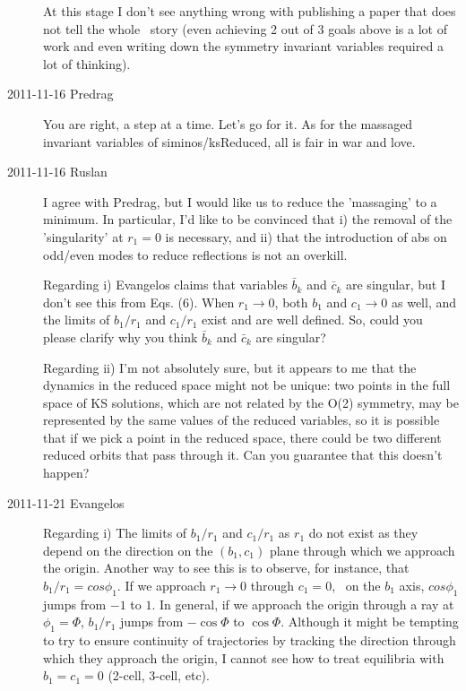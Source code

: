 \begin{description}
At this stage I don't see anything wrong with publishing a paper that does
not tell the whole \KS\ story (even achieving 2 out of 3 goals above is a lot
of work and even writing down the symmetry invariant variables required a lot
of thinking).

\item[2011-11-16 Predrag] You are right, a step at a time. Let's go for
it. As for the massaged invariant variables of siminos/ksReduced, all is
fair in war and love.

\item[2011-11-16 Ruslan] I agree with Predrag, but I would like us to
reduce the 'massaging' to a minimum.  In particular, I'd like to be
convinced that i) the removal of the 'singularity' at $r_1 = 0$ is
necessary, and ii) that the introduction of abs on odd/even modes to
reduce reflections is not an overkill.

    Regarding i) Evangelos claims that variables $\bar{b}_k$ and
    $\bar{c}_k$ are singular, but I don't see this from Eqs. (6).  When
    $r_1 \to 0$, both $b_1$ and $c_1 \to 0$ as well, and the limits of
    $b_1/r_1$ and $c_1/r_1$ exist and are well defined.  So, could you
    please clarify why you think $\bar{b}_k$ and $\bar{c}_k$ are
    singular?

    Regarding ii) I'm not absolutely sure, but it appears to me that the
    dynamics in the reduced space might not be unique: two points in the
    full space of KS solutions, which are not related by the O(2)
    symmetry, may be represented by the same values of the reduced
    variables, so it is possible that if we pick a point in the reduced
    space, there could be two different reduced orbits that pass through
    it.  Can you guarantee that this doesn't happen?

\item[2011-11-21 Evangelos] Regarding i) The limits of
  $b_1/r_1$ and $c_1/r_1$ as $r_1$ do not exist as they depend on the
  direction on the $(b_1,c_1)$ plane through which we approach the origin.
  Another way to see this is to observe, for instance, that $b_1/r_1 = cos \phi_1$.
  If we approach $r_1\rightarrow0$ through $c_1=0$, \ie\ on the $b_1$ axis,
  $cos \phi_1$ jumps from $-1$ to $1$. In general, if we approach the origin
  through a ray at $\phi_1=\Phi$, $b_1/r_1$ jumps from $-\cos \Phi$ to $\cos \Phi$.
  Although it might be tempting to try to ensure continuity of trajectories by
  tracking the direction through which they approach the origin, I cannot see how
  to treat equilibria with $b_1=c_1=0$ (2-cell, 3-cell, etc).


\end{description}
